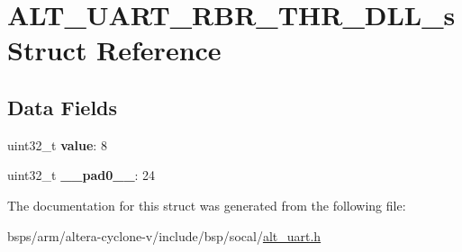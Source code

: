 \hypertarget{structALT__UART__RBR__THR__DLL__s}{}\section{A\+L\+T\+\_\+\+U\+A\+R\+T\+\_\+\+R\+B\+R\+\_\+\+T\+H\+R\+\_\+\+D\+L\+L\+\_\+s Struct Reference}
\label{structALT__UART__RBR__THR__DLL__s}
\subsection*{Data Fields}
\begin{DoxyCompactItemize}
\item 
\mbox{\label{structALT__UART__RBR__THR__DLL__s_afac6fba1668f2aebe05900326c3fc75e}} 
uint32\+\_\+t {\bfseries value}\+: 8
\item 
\mbox{\label{structALT__UART__RBR__THR__DLL__s_a5335bf06e176f32e802317f2d2244d84}} 
uint32\+\_\+t {\bfseries \+\_\+\+\_\+pad0\+\_\+\+\_\+}\+: 24
\end{DoxyCompactItemize}


The documentation for this struct was generated from the following file\+:\begin{DoxyCompactItemize}
\item 
bsps/arm/altera-\/cyclone-\/v/include/bsp/socal/\mbox{\hyperlink{alt__uart_8h}{alt\+\_\+uart.\+h}}\end{DoxyCompactItemize}
